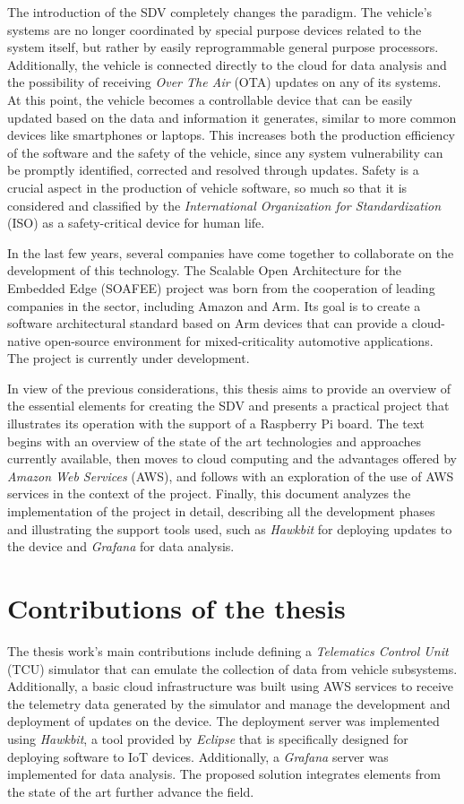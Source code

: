 \documentclass[10pt,a4paper,roman, twocolumn]{article}
\begin{document}
The introduction of the SDV completely changes the paradigm. The vehicle's systems are no longer coordinated by special purpose devices related to the system itself, but rather by easily reprogrammable general purpose processors. Additionally, the vehicle is connected directly to the cloud for data analysis and the possibility of receiving \textit{Over The Air} (OTA) updates on any of its systems. At this point, the vehicle becomes a controllable device that can be easily updated based on the data and information it generates, similar to more common devices like smartphones or laptops. This increases both the production efficiency of the software and the safety of the vehicle, since any system vulnerability can be promptly identified, corrected and resolved through updates. Safety is a crucial aspect in the production of vehicle software, so much so that it is considered and classified by the \textit{International Organization for Standardization} (ISO) as a safety-critical device for human life.

In the last few years, several companies have come together to collaborate on the development of this technology. The Scalable Open Architecture for the Embedded Edge (SOAFEE) project was born from the cooperation of leading companies in the sector, including Amazon and Arm. Its goal is to create a software architectural standard based on Arm devices that can provide a cloud-native open-source environment for mixed-criticality automotive applications. The project is currently under development.

In view of the previous considerations, this thesis aims to provide an overview of the essential elements for creating the SDV and presents a practical project that illustrates its operation with the support of a Raspberry Pi board. The text begins with an overview of the state of the art technologies and approaches currently available, then moves to cloud computing and the advantages offered by \textit{Amazon Web Services} (AWS), and follows with an exploration of the use of AWS services in the context of the project. Finally, this document analyzes the implementation of the project in detail, describing all the development phases and illustrating the support tools used, such as \textit{Hawkbit} for deploying updates to the device and \textit{Grafana} for data analysis.

\section{Contributions of the thesis}
The thesis work's main contributions include defining a \textit{Telematics Control Unit} (TCU) simulator that can emulate the collection of data from vehicle subsystems. Additionally, a basic cloud infrastructure was built using AWS services to receive the telemetry data generated by the simulator and manage the development and deployment of updates on the device. The deployment server was implemented using \textit{Hawkbit}, a tool provided by \textit{Eclipse} that is specifically designed for deploying software to IoT devices. Additionally, a \textit{Grafana} server was implemented for data analysis. The proposed solution integrates elements from the state of the art further advance the field.
\end{document}

